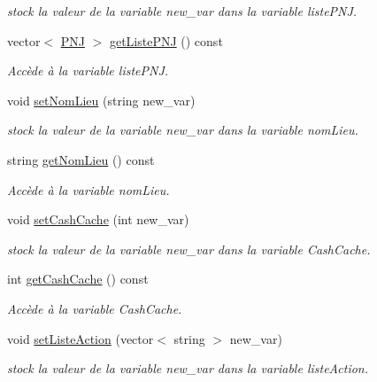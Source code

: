 \begin{DoxyCompactItemize}
\begin{DoxyCompactList}\small\item\em stock la valeur de la variable new\-\_\-var dans la variable liste\-P\-N\-J. \end{DoxyCompactList}\item 
vector$<$ \hyperlink{class_p_n_j}{P\-N\-J} $>$ \hyperlink{class_lieu_abfe724c1e50380a4a4c2d5b522dc60d2}{get\-Liste\-P\-N\-J} () const 
\begin{DoxyCompactList}\small\item\em Accède à la variable liste\-P\-N\-J. \end{DoxyCompactList}\item 
void \hyperlink{class_lieu_a13f53069b0a2f1b4ef399f2998fbea9b}{set\-Nom\-Lieu} (string new\-\_\-var)
\begin{DoxyCompactList}\small\item\em stock la valeur de la variable new\-\_\-var dans la variable nom\-Lieu. \end{DoxyCompactList}\item 
string \hyperlink{class_lieu_a43de9e65cac7649ab5fd4ea14cde55e3}{get\-Nom\-Lieu} () const 
\begin{DoxyCompactList}\small\item\em Accède à la variable nom\-Lieu. \end{DoxyCompactList}\item 
void \hyperlink{class_lieu_ab25609f0f26c916b8e2736ae7f8199fc}{set\-Cash\-Cache} (int new\-\_\-var)
\begin{DoxyCompactList}\small\item\em stock la valeur de la variable new\-\_\-var dans la variable Cash\-Cache. \end{DoxyCompactList}\item 
int \hyperlink{class_lieu_ab6da88a248d20fe79afd6f81c97cf2e9}{get\-Cash\-Cache} () const 
\begin{DoxyCompactList}\small\item\em Accède à la variable Cash\-Cache. \end{DoxyCompactList}\item 
void \hyperlink{class_lieu_ae9635e101b08d67adeb02e2f375be0f2}{set\-Liste\-Action} (vector$<$ string $>$ new\-\_\-var)
\begin{DoxyCompactList}\small\item\em stock la valeur de la variable new\-\_\-var dans la variable liste\-Action. \end{DoxyCompactList}\item 

\end{DoxyCompactItemize}

